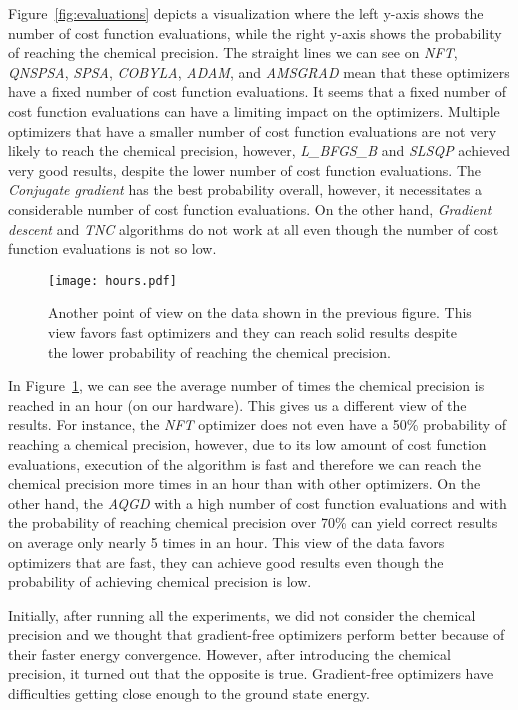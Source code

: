Figure~\ref{fig:evaluations} depicts a visualization where the left y-axis shows the number of cost function evaluations, while the right y-axis shows the probability of reaching the chemical precision. The straight lines we can see on \textit{NFT}, \textit{QNSPSA}, \textit{SPSA}, \textit{COBYLA}, \textit{ADAM}, and \textit{AMSGRAD} mean that these optimizers have a fixed number of cost function evaluations. It seems that a fixed number of cost function evaluations can have a limiting impact on the optimizers. Multiple optimizers that have a smaller number of cost function evaluations are not very likely to reach the chemical precision, however, \textit{L\_BFGS\_B} and \textit{SLSQP} achieved very good results, despite the lower number of cost function evaluations. The \textit{Conjugate gradient} has the best probability overall, however, it necessitates a considerable number of cost function evaluations. On the other hand, \textit{Gradient descent} and \textit{TNC} algorithms do not work at all even though the number of cost function evaluations is not so low.

\begin{figure}[H]
    \centering
    \texttt{[image: hours.pdf]}
    \caption{Another point of view on the data shown in the previous figure. This view favors fast optimizers and they can reach solid results despite the lower probability of reaching the chemical precision.}
    \label{fig:hours}
\end{figure}

In Figure~\ref{fig:hours}, we can see the average number of times the chemical precision is reached in an hour (on our hardware). This gives us a different view of the results. For instance, the \textit{NFT} optimizer does not even have a 50\% probability of reaching a chemical precision, however, due to its low amount of cost function evaluations, execution of the algorithm is fast and therefore we can reach the chemical precision more times in an hour than with other optimizers. On the other hand, the \textit{AQGD} with a high number of cost function evaluations and with the probability of reaching chemical precision over 70\% can yield correct results on average only nearly 5 times in an hour. This view of the data favors optimizers that are fast, they can achieve good results even though the probability of achieving chemical precision is low.

Initially, after running all the experiments, we did not consider the chemical precision and we thought that gradient-free optimizers perform better because of their faster energy convergence. However, after introducing the chemical precision, it turned out that the opposite is true. Gradient-free optimizers have difficulties getting close enough to the ground state energy.

